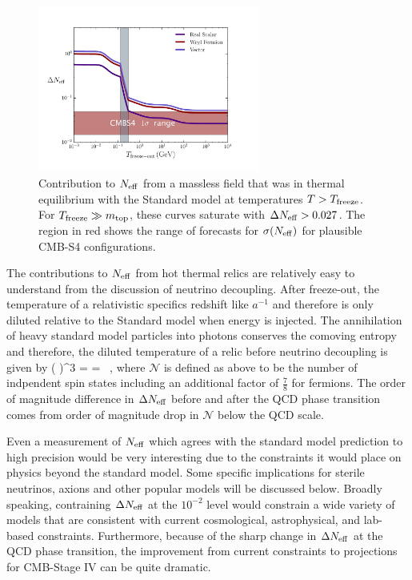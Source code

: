 \begin{figure}[t!]
\begin{center}
\includegraphics[width=0.65\textwidth]{Neutrinos/Neff.pdf}
\caption{Contribution to $N_{\rm eff}$ from a massless field that was in thermal equilibrium with the Standard model at temperatures $T> T_{\rm freeze}$.  For $T_{\rm freeze} \gg m_{\rm top}$, these curves saturate with $\Delta N_{\rm eff} > 0.027$.   The region in red shows the range of forecasts for $\sigma(N_{\rm eff})$ for plausible CMB-S4 configurations. }
\label{fig:limits}
\end{center}
\end{figure} 

The contributions to $N_{\rm eff}$ from hot thermal relics are relatively easy to understand from the discussion of neutrino decoupling.  After freeze-out, the temperature of a relativistic specifics redshift like $a^{-1}$ and therefore is only diluted relative to the Standard model when energy is injected.  The annihilation of heavy standard model particles into photons conserves the comoving entropy and therefore, the diluted temperature of a relic before neutrino decoupling is given by
\beq
\left(  \right)^3 = =  \, ,
\eeq
where $\mathcal{N}$ is defined as above to be the number of indpendent spin states including an additional factor of $\frac{7}{8}$ for fermions.  The order of magnitude difference in $\Delta N_{\rm eff}$ before and after the QCD phase transition comes from order of magnitude drop in $\mathcal{N}$ below the QCD scale.

Even a measurement of $N_{\rm eff}$ which agrees with the standard model prediction to high precision would be very interesting due to the constraints it would place on physics beyond the standard model.  Some specific implications for sterile neutrinos, axions and other popular models will be discussed below.  Broadly speaking, contraining $\Delta N_{\rm eff}$ at the $10^{-2}$ level would constrain a wide variety of models that are consistent with current cosmological, astrophysical, and lab-based constraints.  Furthermore, because of the sharp change in $\Delta N_{\rm eff}$ at the QCD phase transition, the improvement from current constraints to projections for CMB-Stage IV can be quite dramatic.

